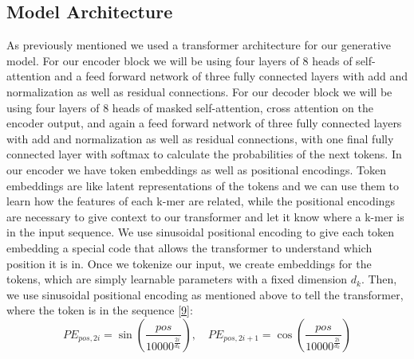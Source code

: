 \documentclass{article}
\begin{document}
\subsection{Model Architecture}
As previously mentioned we used a transformer architecture for our generative model. For our encoder block we will be using four layers of 8 heads of self-attention and a feed forward network of three fully connected layers with add and normalization as well as residual connections. For our decoder block we will be using four layers of 8 heads of masked self-attention, cross attention on the encoder output, and again a feed forward network of three fully connected layers with add and normalization as well as residual connections, with one final fully connected layer with softmax to calculate the probabilities of the next tokens. In our encoder we have token embeddings as well as positional encodings. Token embeddings are like latent representations of the tokens and we can use them to learn how the features of each k-mer are related, while the positional encodings are necessary to give context to our transformer and let it know where a k-mer is in the input sequence. We use sinusoidal positional encoding to give each token embedding a special code that allows the transformer to understand which position it is in. Once we tokenize our input, we create embeddings for the tokens, which are simply learnable parameters with a fixed dimension $ d_{k} $. Then, we use sinusoidal positional encoding as mentioned above to tell the transformer, where the token is in the sequence \hyperref[Reference 9]{[9]}: 
\vspace{1em}
\[
PE_{pos,2i} = \sin{(\frac{pos}{10000^{\frac{2i}{d_{k}}}})}, \quad 
PE_{pos,2i+1} = \cos{(\frac{pos}{10000^{\frac{2i}{d_{k}}}})}
\]
\vspace{1em}
\end{document}

